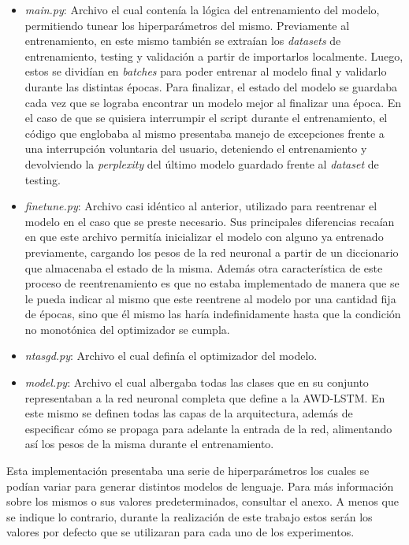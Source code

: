 \begin{itemize}
    \item \textit{main.py}: Archivo el cual contenía la lógica del entrenamiento del modelo, permitiendo tunear los hiperparámetros del mismo. Previamente al entrenamiento, en este mismo también se extraían los \textit{datasets} de entrenamiento, testing y validación a partir de importarlos localmente. Luego, estos se dividían en \textit{batches} para poder entrenar al modelo final y validarlo durante las distintas épocas. Para finalizar, el estado del modelo se guardaba cada vez que se lograba encontrar un modelo mejor al finalizar una época. En el caso de que se quisiera interrumpir el script durante el entrenamiento, el código que englobaba al mismo presentaba manejo de excepciones frente a una interrupción voluntaria del usuario, deteniendo el entrenamiento y devolviendo la \textit{perplexity} del último modelo guardado frente al \textit{dataset} de testing.
    \item \textit{finetune.py}: Archivo casi idéntico al anterior, utilizado para reentrenar el modelo en el caso que se preste necesario. Sus principales diferencias recaían en que este archivo permitía inicializar el modelo con alguno ya entrenado previamente, cargando los pesos de la red neuronal a partir de un diccionario que almacenaba el estado de la misma. Además otra característica de este proceso de reentrenamiento es que no estaba implementado de manera que se le pueda indicar al mismo que este reentrene al modelo por una cantidad fija de épocas, sino que él mismo las haría indefinidamente hasta que la condición no monotónica del optimizador se cumpla.
    \item \textit{ntasgd.py}: Archivo el cual definía el optimizador del modelo.
    \item \textit{model.py}: Archivo el cual albergaba todas las clases que en su conjunto representaban a la red neuronal completa que define a la AWD-LSTM. En este mismo se definen todas las capas de la arquitectura, además de especificar cómo se propaga para adelante la entrada de la red, alimentando así los pesos de la misma durante el entrenamiento.
\end{itemize}

Esta implementación presentaba una serie de hiperparámetros los cuales se podían variar para generar distintos modelos de lenguaje. Para más información sobre los mismos o sus valores predeterminados, consultar el anexo. A menos que se indique lo contrario, durante la realización de este trabajo estos serán los valores por defecto que se utilizaran para cada uno de los experimentos.

